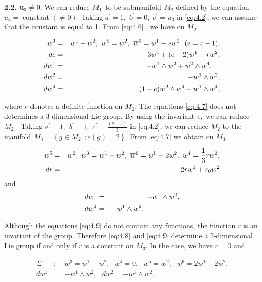 \documentclass{amsproc}
\theoremstyle{remark}
\numberwithin{equation}{section}
\begin{document}
\textbf{2.2. u}$_{3}\neq 0.$ We can reduce $M_{1\text{ }}$to be submanifold $M_{2}$ defined by the equation $u_{3}=$ constant $(\neq 0).$ Taking $a^{\prime }=1,$ $b^{\prime }=0,$ $c^{\prime }=u_{3}$ in \eqref{eq:4.2}, we can
assume that the constant is equal to 1. From \eqref{eq:4.6} , we have on $M_{2}$

\begin{eqnarray}
w^{3} &=&w^{1}-w^{2},\text{ }w^{5}=w^{2},\text{ }\overline{w}^{6}=w^{1}-ew^{2}\text{ \ }(e=c-1), \notag \\
de &=&-3w^{4}+(e-2)w^{1}+rw^{2}, \notag \\
dw^{1} &=&-w^{1}\wedge w^{2}+w^{2}\wedge w^{4},
\label{eq:4.7}
 \text{ \ \ } \\
  dw^{2} &=&-w^{1}\wedge w^{2},\notag \\
  dw^{4} &=&(1-e)w^{2}\wedge w^{4}+w^{1}\wedge w^{4},\notag
\end{eqnarray}

where $r$ denotes a definite function on $M_{2}.$ The equations \eqref{eq:4.7} does
not determines a 3-dimensional Lie group. By using the invariant $e,$ we can
reduce $M_{2.\text{ }}$ Taking $a^{\prime }=1,$ $b^{\prime }=1,$ $c^{\prime
}=\frac{(2-e)}{3}$ in \eqref{eq:4.2}, we can reduce $M_{2}$ to the manifold $M_{3}=\left\{ g\in M_{2\text{ }};e(g)=2\right\} .$ From \eqref{eq:4.7} we obtain
on $M_{3}$

\begin{eqnarray}
w^{5} &=&w^{2},\text{ }w^{3}=w^{1}-w^{2},\text{ }\overline{w}^{6}=w^{1}-2w^{2},\text{ }w^{4}=\frac{1}{3}rw^{2}, \notag \\
dr &=&2rw^{1}+r_{0}w^{2}
\label{eq:4.8}
\end{eqnarray}
and
\begin{eqnarray}
dw^{1} &=&-w^{1}\wedge w^{2}, \notag \\
dw^{2} &=&-w^{1}\wedge w^{2}.\text{ \ \ \ \ \ \ \ \ \ \ \ \ \ \ }\label{eq:4.9}
\end{eqnarray}

Although the equations \eqref{eq:4.9} do not contain any functions, the function $r$
is an invariant of the group. Therefore \eqref{eq:4.8} and \eqref{eq:4.9} determine a
2-dimensional Lie group if and only if $r$ is a constant on $M_{3}.$ In the
case, we have $r=0$ and

\begin{eqnarray*}
\Sigma &:&w^{3}=w^{1}-w^{2},\text{ }w^{4}=0,\text{ }w^{5}=w^{2},\text{ }w^{6}=2w^{1}-2w^{2}. \\
dw^{1} &=&-w^{1}\wedge w^{2},\text{ \ }dw^{2}=-w^{1}\wedge w^{2}.
\end{eqnarray*}
\end{document}
